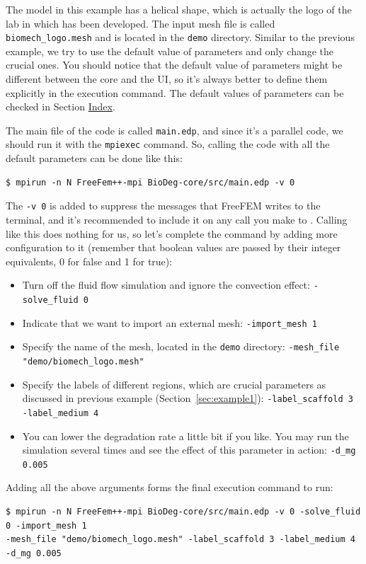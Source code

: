 The model in this example has a helical shape, which is actually the logo of the lab in which \biodeg{} has been developed. The input mesh file is called \verb|biomech_logo.mesh| and is located in the \verb|demo| directory. Similar to the previous example, we try to use the default value of parameters and only change the crucial ones. You should notice that the default value of parameters might be different between the core \biodeg{} and the UI, so it's always better to define them explicitly in the execution command. The default values of parameters can be checked in Section  \hyperref[sec:index]{Index}.

The main file of the \biodeg{} code is called \verb|main.edp|, and since it's a parallel code, we should run it with the \verb|mpiexec| command. So, calling the code with all the default parameters can be done like this:
\begin{verbatim}
$ mpirun -n N FreeFem++-mpi BioDeg-core/src/main.edp -v 0
\end{verbatim}

The \verb|-v 0| is added to suppress the messages that FreeFEM writes to the terminal, and it's recommended to include it on any call you make to \biodeg{}. Calling \biodeg{} like this does nothing for us, so let's complete the command by adding more configuration to it (remember that boolean values are passed by their integer equivalents, 0 for false and 1 for true):

\begin{itemize}
\item
Turn off the fluid flow simulation and ignore the convection effect: \verb|-solve_fluid 0|
\item
Indicate that we want to import an external mesh: \verb|-import_mesh 1|
\item
Specify the name of the mesh, located in the \verb|demo| directory: \verb|-mesh_file "demo/biomech_logo.mesh"|
\item 
Specify the labels of different regions, which are crucial parameters as discussed in previous example (Section~\ref{sec:example1}): \verb|-label_scaffold 3 -label_medium 4|
\item
You can lower the degradation rate a little bit if you like. You may run the simulation several times and see the effect of this parameter in action: \verb|-d_mg 0.005|
\end{itemize}

Adding all the above arguments forms the final execution command to run:
\begin{verbatim}
$ mpirun -n N FreeFem++-mpi BioDeg-core/src/main.edp -v 0 -solve_fluid 0 -import_mesh 1 
-mesh_file "demo/biomech_logo.mesh" -label_scaffold 3 -label_medium 4 -d_mg 0.005
\end{verbatim}


